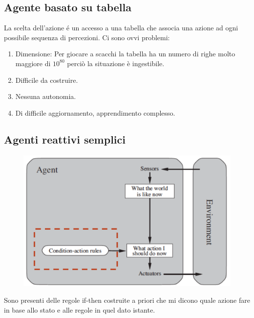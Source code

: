 \documentclass{article}
\begin{document}
\subsection{Agente basato su tabella}
La scelta dell'azione é un accesso a una tabella che associa una azione ad ogni possibile sequenza di percezioni. Ci sono ovvi problemi:
\begin{enumerate}
    \item Dimensione: Per giocare a scacchi la tabella ha un numero di righe molto maggiore di $10^{80}$ perciò la situazione è ingestibile.
    \item Difficile da costruire.
    \item Nessuna autonomia.
    \item Di difficile aggiornamento, apprendimento complesso.
\end{enumerate}

\subsection{Agenti reattivi semplici}
\begin{figure}[H]
    \centering
    \includegraphics[scale=0.4]{Images/agentireattivisemplici.png}
\end{figure}
Sono presenti delle regole if-then costruite a priori che mi dicono quale azione fare in base allo stato e alle regole in quel dato istante.
\clearpage
\end{document}
